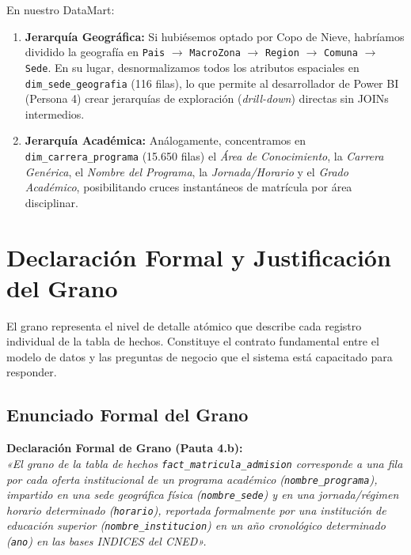 \documentclass[11pt,a4paper]{article}
\begin{document}
En nuestro DataMart:
\begin{enumerate}[leftmargin=*]
    \item \textbf{Jerarquía Geográfica:} Si hubiésemos optado por Copo de Nieve, habríamos dividido la geografía en \texttt{Pais} $\rightarrow$ \texttt{MacroZona} $\rightarrow$ \texttt{Region} $\rightarrow$ \texttt{Comuna} $\rightarrow$ \texttt{Sede}. En su lugar, desnormalizamos todos los atributos espaciales en \texttt{dim\_sede\_geografia} (116 filas), lo que permite al desarrollador de Power BI (Persona 4) crear jerarquías de exploración (\textit{drill-down}) directas sin JOINs intermedios.
    \item \textbf{Jerarquía Académica:} Análogamente, concentramos en \texttt{dim\_carrera\_programa} (15.650 filas) el \textit{Área de Conocimiento}, la \textit{Carrera Genérica}, el \textit{Nombre del Programa}, la \textit{Jornada/Horario} y el \textit{Grado Académico}, posibilitando cruces instantáneos de matrícula por área disciplinar.
\end{enumerate}

\section{Declaración Formal y Justificación del Grano}
\label{sec:grano}

El grano representa el nivel de detalle atómico que describe cada registro individual de la tabla de hechos. Constituye el contrato fundamental entre el modelo de datos y las preguntas de negocio que el sistema está capacitado para responder.

\subsection{Enunciado Formal del Grano}
\begin{tcolorbox}[colback=lightbg, colframe=primaryblue]
\textbf{Declaración Formal de Grano (Pauta 4.b):}\\
\textit{«El grano de la tabla de hechos \texttt{fact\_matricula\_admision} corresponde a una fila por cada oferta institucional de un programa académico (\texttt{nombre\_programa}), impartido en una sede geográfica física (\texttt{nombre\_sede}) y en una jornada/régimen horario determinado (\texttt{horario}), reportada formalmente por una institución de educación superior (\texttt{nombre\_institucion}) en un año cronológico determinado (\texttt{ano}) en las bases INDICES del CNED».}
\end{tcolorbox}
\end{document}
